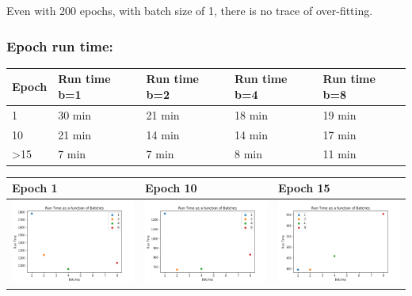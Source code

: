 Even with 200 epochs, with batch size of 1, there is no trace of
over-fitting.

\subsubsection{Epoch run time:}\label{epoch-run-time}

\begin{longtable}[]{@{}lllll@{}}
\toprule
Epoch & Run time b=1 & Run time b=2 & Run time b=4 & Run time
b=8\tabularnewline
\midrule
\endhead
1 & 30 min & 21 min & 18 min & 19 min\tabularnewline
10 & 21 min & 14 min & 14 min & 17 min\tabularnewline
\textgreater{}15 & 7 min & 7 min & 8 min & 11 min\tabularnewline
\bottomrule
\end{longtable}

\begin{longtable}[]{@{}lll@{}}
\toprule
Epoch 1 & Epoch 10 & Epoch 15\tabularnewline
\midrule
\endhead
\includegraphics{b1a8_batch_epoch_1.png} &
\includegraphics{b1a8_batch_epoch_10.png} &
\includegraphics{b1a8_batch_epoch_15.png}\tabularnewline

\end{longtable}
